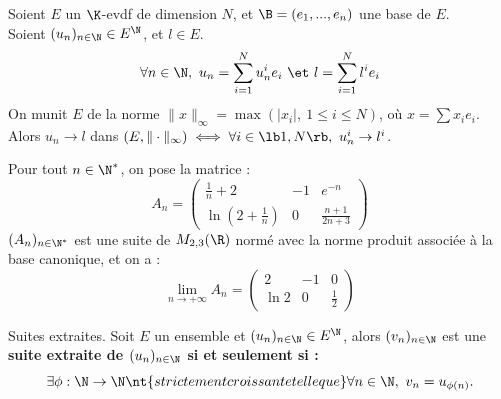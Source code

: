 \documentclass[11pt]{article}
\begin{document}
\vspace*{-0.7cm}

\begin{prop}{}{}
    Soient $E$ un $\K$-evdf de dimension $N$, et $\B=(e_1,...,e_n)$ une base de $E$.\\
    Soient $(u_n)_{n\in\N}\in E^\N$, et $l\in E$.
    \begin{equation*}
        \forall n \in \N, ~ u_n = \sum_{i=1}^Nu_n^ie_i ~\et~ l=\sum_{i=1}^Nl^ie_i 
    \end{equation*}
    On munit $E$ de la norme $\|x\|_\infty=\max(|x_i|, ~ 1\leq i \leq N)$, où $x=\sum x_i e_i$.\\
    Alors $u_n\to l$ dans $(E,\|\cdot\|_\infty) \iff \forall i \in \lb1,N\rb, ~ u_n^i \to l^i$.
\end{prop}

\vspace*{-0.7cm}

\begin{ex}{}{}
    Pour tout $n\in\N^*$, on pose la matrice :
    \begin{equation*}
        A_n = \begin{pmatrix}
            \frac{1}{n}+2 & -1 & e^{-n} \\ \ln\left( 2 + \frac{1}{n} \right) & 0 & \frac{n+1}{2n+3}
        \end{pmatrix}
    \end{equation*}
    $(A_n)_{n\in\N^*}$ est une suite de $M_{2,3}(\R)$ normé avec la norme produit associée à la base canonique, et on a :
    \begin{equation*}
        \lim_{n\to+\infty} A_n = \begin{pmatrix}
            2 & -1 & 0 \\ \ln 2 & 0 & \frac{1}{2}
        \end{pmatrix}
    \end{equation*}
\end{ex}

\begin{defi}{Suites extraites.}{}
    Soit $E$ un ensemble et $(u_n)_{n\in\N}\in E^\N$, alors $(v_n)_{n\in\N}$ est une \bf{suite extraite} de $(u_n)_{n\in\N}$ si et seulement si :
    \begin{equation*}
        \exists \phi : \N \to \N \nt{ strictement croissante telle que } \forall n \in \N, ~ v_n = u_{\phi(n)}.
    \end{equation*}
\end{defi}

\vspace*{-0.7cm}
\end{document}
